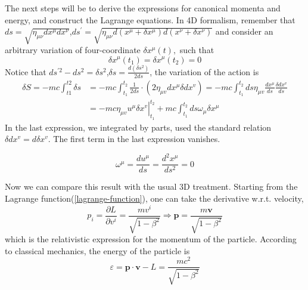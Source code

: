 The next steps will be to derive the expressions for canonical momenta and energy, and construct the Lagrange equations. In 4D formalism, remember that $d s=\sqrt{\eta_{\mu \nu} d x^{\mu} d x^{\nu}}$,$ds^{\prime}=\sqrt{\eta_{\mu \nu} d (x^{\mu}+\delta x^{\mu}) d (x^{\nu}+\delta x^{\nu})}$ and consider an arbitrary variation of four-coordinate $\delta x^{\mu}(t),$ such that
\begin{equation}
\delta x^{\mu}\left(t_{1}\right)=\delta x^{\mu}\left(t_{2}\right)=0
\end{equation}
Notice that $ds^{\prime 2}-ds^{2}=\delta s^2$,$\delta s=\frac{d(\delta s^2)}{2ds}$, the variation of the action is
\begin{equation}
\begin{aligned}
\delta S=-mc\int_{t1}^{t2}\delta s &=-m c \int_{t_{1}}^{t_{2}} \frac{1}{2 d s} \cdot\left(2 \eta_{\mu v} d x^{\mu} \delta d x^{v}\right)=-m c \int_{t_{1}}^{t_{2}} d s \eta_{\mu v} \frac{d x^{\mu}}{d s} \frac{\delta d x^{v}}{d s} \\
&=-\left.m c \eta_{\mu v} u^{\mu} \delta x^{v}\right|_{t_{1}} ^{t_{2}}+m c \int_{t_{1}}^{t_{2}} d s \omega_{\mu} \delta x^{\mu}
\end{aligned}
\end{equation}
In the last expression, we integrated by parts, used the standard relation $\delta d x^{v}=d \delta x^{v}$. The first term in the last expression vanishes. 
\begin{qt}
    \begin{equation}
\omega^{\mu}=\frac{d u^{\mu}}{d s}=\frac{d^{2} x^{\mu}}{d s^{2}}=0
\end{equation}
\end{qt}
Now we can compare this result with the usual 3D treatment. Starting from the Lagrange function(\ref{lagrange-function}), one can take the derivative w.r.t. velocity,
\begin{equation}
p_{i}=\frac{\partial L}{\partial v^{i}}=\frac{m v^{i}}{\sqrt{1-\beta^{2}}} \Longrightarrow \mathbf{p}=\frac{m \mathbf{v}}{\sqrt{1-\beta^{2}}}
\label{relativisitic-momentum}
\end{equation}
which is the relativistic expression for the momentum of the particle. According to classical mechanics, the energy of the particle is
\begin{equation}
\varepsilon=\mathbf{p} \cdot \mathbf{v}-L=\frac{m c^{2}}{\sqrt{1-\beta^{2}}}
\label{relativistic-hamiltonian}
\end{equation}
